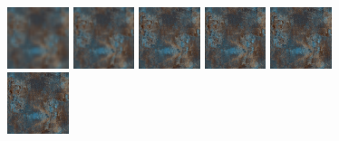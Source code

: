 \begin{figure}[!h]
\centering
\includegraphics[width=0.16\textwidth]{img/ch6/dirty/train1.png}
\includegraphics[width=0.16\textwidth]{img/ch6/dirty/train2.png}
\includegraphics[width=0.16\textwidth]{img/ch6/dirty/train3.png}
\includegraphics[width=0.16\textwidth]{img/ch6/dirty/train4.png}
\includegraphics[width=0.16\textwidth]{img/ch6/dirty/train5.png}
\includegraphics[width=0.16\textwidth]{img/ch6/dirty/train6.png}


\end{figure}
